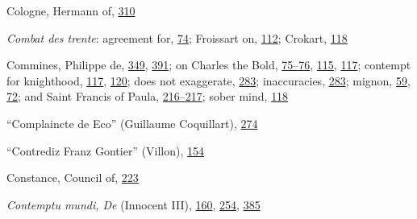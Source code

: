 Cologne, Hermann of,
\protect\hyperlink{20_ILLUSTRATIONS_FOLLOW_PAGE.xhtmlux5cux23page_310}{310}

\emph{Combat des trente}: agreement for,
\protect\hyperlink{10_Chapter_Three__THE_HEROIC_DREAM.xhtmlux5cux23page_74}{74};
Froissart on,
\protect\hyperlink{10_Chapter_Three__THE_HEROIC_DREAM.xhtmlux5cux23page_112}{112};
Crokart,
\protect\hyperlink{10_Chapter_Three__THE_HEROIC_DREAM.xhtmlux5cux23page_118}{118}

Commines, Philippe de,
\protect\hyperlink{21_Chapter_Thirteen__IMAGE_AND_WORD.xhtmlux5cux23page_349}{349},
\protect\hyperlink{22_Chapter_Fourteen__THE_COMING_OF.xhtmlux5cux23page_391}{391};
on Charles the Bold,
\protect\hyperlink{10_Chapter_Three__THE_HEROIC_DREAM.xhtmlux5cux23page_75}{75--}\protect\hyperlink{10_Chapter_Three__THE_HEROIC_DREAM.xhtmlux5cux23page_76}{76},
\protect\hyperlink{10_Chapter_Three__THE_HEROIC_DREAM.xhtmlux5cux23page_115}{115},
\protect\hyperlink{10_Chapter_Three__THE_HEROIC_DREAM.xhtmlux5cux23page_117}{117};
contempt for knighthood,
\protect\hyperlink{10_Chapter_Three__THE_HEROIC_DREAM.xhtmlux5cux23page_117}{117},
\protect\hyperlink{10_Chapter_Three__THE_HEROIC_DREAM.xhtmlux5cux23page_120}{120};
does not exaggerate,
\protect\hyperlink{18_Chapter_Eleven__THE_FORMS_OF_THO.xhtmlux5cux23page_283}{283};
inaccuracies,
\protect\hyperlink{18_Chapter_Eleven__THE_FORMS_OF_THO.xhtmlux5cux23page_283}{283};
mignon,
\protect\hyperlink{09_Chapter_Two__THE_CRAVING_FOR_A_M.xhtmlux5cux23page_59}{59},
\protect\hyperlink{10_Chapter_Three__THE_HEROIC_DREAM.xhtmlux5cux23page_72}{72};
and Saint Francis of Paula,
\protect\hyperlink{14_Chapter_Seven__THE_PIOUS_PERSONA.xhtmlux5cux23page_216}{216--}\protect\hyperlink{14_Chapter_Seven__THE_PIOUS_PERSONA.xhtmlux5cux23page_217}{217};
sober mind,
\protect\hyperlink{10_Chapter_Three__THE_HEROIC_DREAM.xhtmlux5cux23page_118}{118}

``Complaincte de Eco'' (Guillaume Coquillart),
\protect\hyperlink{18_Chapter_Eleven__THE_FORMS_OF_THO.xhtmlux5cux23page_274}{274}

``Contrediz Franz Gontier'' (Villon),
\protect\hyperlink{11_Chapter_Four__THE_FORMS_OF_LOVE.xhtmlux5cux23page_154}{154}

Constance, Council of,
\protect\hyperlink{15_Chapter_Eight__RELIGIOUS_EXCITAT.xhtmlux5cux23page_223}{223}

\emph{Contemptu mundi, De} (Innocent III),
\protect\hyperlink{12_Chapter_Five__THE_VISION_OF_DEAT.xhtmlux5cux23page_160}{160},
\protect\hyperlink{17_Chapter_Ten__THE_FAILURE_OF_IMAG.xhtmlux5cux23page_254}{254},
\protect\hyperlink{22_Chapter_Fourteen__THE_COMING_OF.xhtmlux5cux23page_385}{385}

